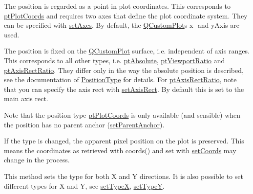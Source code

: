 \begin{DoxyItemize}
\item The position is regarded as a point in plot coordinates. This corresponds to \hyperlink{class_q_c_p_item_position_aad9936c22bf43e3d358552f6e86dbdc8ad5ffb8dc99ad73263f7010c77342294c}{pt\+Plot\+Coords} and requires two axes that define the plot coordinate system. They can be specified with \hyperlink{class_q_c_p_item_position_a2185f45c75ac8cb9be89daeaaad50e37}{set\+Axes}. By default, the \hyperlink{class_q_custom_plot}{Q\+Custom\+Plot}\textquotesingle{}s x-\/ and y\+Axis are used.\end{DoxyItemize}
\begin{DoxyItemize}
\item The position is fixed on the \hyperlink{class_q_custom_plot}{Q\+Custom\+Plot} surface, i.\+e. independent of axis ranges. This corresponds to all other types, i.\+e. \hyperlink{class_q_c_p_item_position_aad9936c22bf43e3d358552f6e86dbdc8a564f5e53e550ead1ec5fc7fc7d0b73e0}{pt\+Absolute}, \hyperlink{class_q_c_p_item_position_aad9936c22bf43e3d358552f6e86dbdc8ac7d6aa89ceacb39658b0d6da061c789a}{pt\+Viewport\+Ratio} and \hyperlink{class_q_c_p_item_position_aad9936c22bf43e3d358552f6e86dbdc8a01080fd00eaf09fa238ef6b73bbfef75}{pt\+Axis\+Rect\+Ratio}. They differ only in the way the absolute position is described, see the documentation of \hyperlink{class_q_c_p_item_position_aad9936c22bf43e3d358552f6e86dbdc8}{Position\+Type} for details. For \hyperlink{class_q_c_p_item_position_aad9936c22bf43e3d358552f6e86dbdc8a01080fd00eaf09fa238ef6b73bbfef75}{pt\+Axis\+Rect\+Ratio}, note that you can specify the axis rect with \hyperlink{class_q_c_p_item_position_a0cd9b326fb324710169e92e8ca0041c2}{set\+Axis\+Rect}. By default this is set to the main axis rect.\end{DoxyItemize}
Note that the position type \hyperlink{class_q_c_p_item_position_aad9936c22bf43e3d358552f6e86dbdc8ad5ffb8dc99ad73263f7010c77342294c}{pt\+Plot\+Coords} is only available (and sensible) when the position has no parent anchor (\hyperlink{class_q_c_p_item_position_ac094d67a95d2dceafa0d50b9db3a7e51}{set\+Parent\+Anchor}).

If the type is changed, the apparent pixel position on the plot is preserved. This means the coordinates as retrieved with coords() and set with \hyperlink{class_q_c_p_item_position_aa988ba4e87ab684c9021017dcaba945f}{set\+Coords} may change in the process.

This method sets the type for both X and Y directions. It is also possible to set different types for X and Y, see \hyperlink{class_q_c_p_item_position_a2113b2351d6d00457fb3559a4e20c3ea}{set\+TypeX}, \hyperlink{class_q_c_p_item_position_ac2a454aa5a54c1615c50686601ec4510}{set\+TypeY}. 

